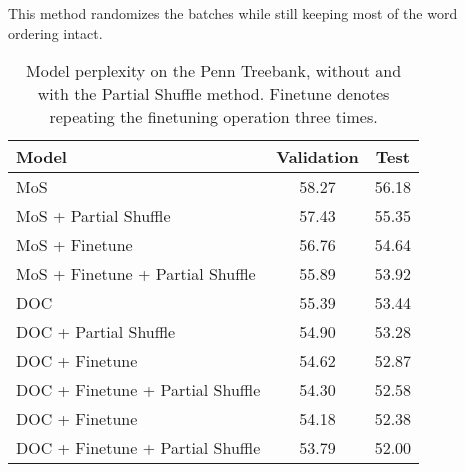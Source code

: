\documentclass[11pt,a4paper]{article}
\begin{document}
This method randomizes the batches while still keeping most of the word ordering intact. 
\begin{table}[t!]
\begin{center}
{\small
\begin{tabular}{@{}lcc@{}}

\toprule
Model                                & Validation & Test  \\ \midrule
MoS                                  & 58.27      & 56.18 \\
MoS + Partial Shuffle              & 57.43      & 55.35 \\
MoS + Finetune                       & 56.76      & 54.64 \\
MoS + Finetune + Partial Shuffle   & 55.89      & 53.92 \\ \midrule
DOC                                  & 55.39      & 53.44 \\
DOC + Partial Shuffle              & 54.90      & 53.28 \\
DOC + Finetune                       & 54.62      & 52.87 \\
DOC + Finetune + Partial Shuffle   & 54.30      & 52.58 \\
DOC + Finetune                    & 54.18      & 52.38 \\
DOC + Finetune + Partial Shuffle & 53.79      & 52.00 \\ \bottomrule

\end{tabular} }
\end{center}
\caption{\label{PTB} Model perplexity on the Penn Treebank, without and with the Partial Shuffle method. Finetune denotes repeating the finetuning operation three times.  }
\end{table}
\end{document}
